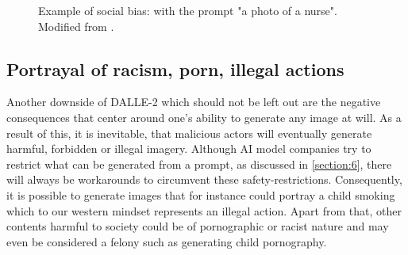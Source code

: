 \documentclass[10pt,twocolumn,twoside]{osajnl}
\begin{document}
\begin{figure}[htbp]
	\centering
	\caption{Example of social bias: with the prompt "a photo of a nurse". Modified from \cite{DallEval}.}
	\label{PhotoOfANurse}
\end{figure}


\subsection{Portrayal of racism, porn, illegal actions}
Another downside of DALLE-2 which should not be left out are the negative consequences that center around one's ability to generate any image at will. 
As a result of this, it is inevitable, that malicious actors will eventually generate harmful, forbidden or illegal imagery. 
Although AI model companies try to restrict what can be generated from a prompt, as discussed in \ref{section:6}, there will always be workarounds to circumvent these safety-restrictions.
Consequently, it is possible to generate images that for instance could portray a child smoking which to our western mindset represents an illegal action. 
Apart from that, other contents harmful to society could be of pornographic or racist nature and may even be considered a felony such as generating child pornography. 
\end{document}

